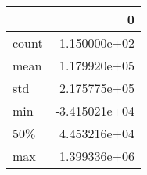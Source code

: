 \begin{tabular}{lr}
\toprule
{} &             0 \\
\midrule
count &  1.150000e+02 \\
mean  &  1.179920e+05 \\
std   &  2.175775e+05 \\
min   & -3.415021e+04 \\

50\%   &  4.453216e+04 \\

max   &  1.399336e+06 \\
\bottomrule
\end{tabular}

